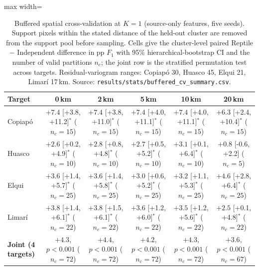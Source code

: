 \begin{table}[ht]
    \centering
    \caption{Buffered spatial cross-validation at $K=1$ (source-only features, five seeds). Support pixels within the stated distance of the held-out cluster are removed from the support pool before sampling. Cells give the cluster-level paired Reptile $-$ Independent difference in pp $F_1$ with 95\% hierarchical-bootstrap CI and the number of valid partitions $n_c$; the joint row is the stratified permutation test across targets. Residual-variogram ranges: Copiap\'o 30, Huasco 45, Elqui 21, Limar\'i 17\,km. Source: \texttt{results/stats/buffered\_cv\_summary.csv}.}
    \label{tab:buffered_cv}
    \footnotesize
    \begin{adjustbox}{max width=\textwidth}
    \begin{tabular}{lccccc}
        \toprule
        \textbf{Target} & \textbf{0\,km} & \textbf{2\,km} & \textbf{5\,km} & \textbf{10\,km} & \textbf{20\,km} \\
        \midrule
        Copiap\'o & $+7.4$ [+3.8, +11.2]$^{*}$ ($n_c=15$) & $+7.4$ [+3.8, +11.0]$^{*}$ ($n_c=15$) & $+7.4$ [+4.0, +11.1]$^{*}$ ($n_c=15$) & $+7.4$ [+4.0, +11.1]$^{*}$ ($n_c=15$) & $+6.3$ [+2.4, +10.4]$^{*}$ ($n_c=15$) \\
        Huasco & $+2.6$ [+0.2, +4.9]$^{*}$ ($n_c=10$) & $+2.8$ [+0.8, +4.8]$^{*}$ ($n_c=10$) & $+2.7$ [+0.5, +5.2]$^{*}$ ($n_c=10$) & $+3.1$ [+0.1, +6.4]$^{*}$ ($n_c=10$) & $+0.8$ [-0.6, +2.2] ($n_c=5$) \\
        Elqui & $+3.6$ [+1.4, +5.7]$^{*}$ ($n_c=25$) & $+3.6$ [+1.4, +5.8]$^{*}$ ($n_c=25$) & $+3.0$ [+0.6, +5.2]$^{*}$ ($n_c=25$) & $+3.2$ [+1.1, +5.3]$^{*}$ ($n_c=25$) & $+4.6$ [+2.8, +6.4]$^{*}$ ($n_c=25$) \\
        Limar\'i & $+3.8$ [+1.4, +6.1]$^{*}$ ($n_c=22$) & $+3.8$ [+1.5, +6.1]$^{*}$ ($n_c=22$) & $+3.6$ [+1.2, +6.0]$^{*}$ ($n_c=22$) & $+3.5$ [+1.2, +5.6]$^{*}$ ($n_c=22$) & $+2.5$ [+0.1, +4.8]$^{*}$ ($n_c=22$) \\
        \midrule
        \textbf{Joint (4 targets)} & $\mathbf{+4.3}$, $p<0.001$ ($n_c=72$) & $\mathbf{+4.4}$, $p<0.001$ ($n_c=72$) & $\mathbf{+4.2}$, $p<0.001$ ($n_c=72$) & $\mathbf{+4.3}$, $p<0.001$ ($n_c=72$) & $\mathbf{+3.6}$, $p<0.001$ ($n_c=67$) \\
        \bottomrule
    \end{tabular}
    \end{adjustbox}
\end{table}
